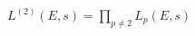 \documentclass[12pt]{article}
\begin{document}
\(\displaystyle L^{(2)}(E,s)=\prod_{p\neq2}L_p(E,s)\)
\end{document}
